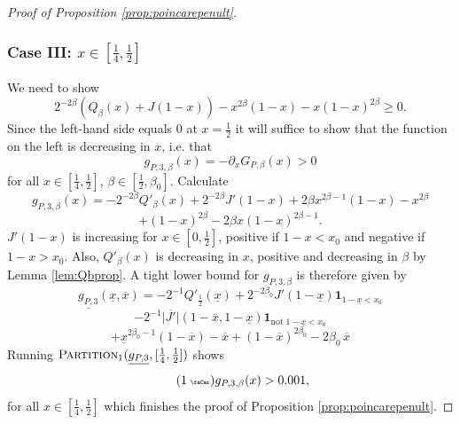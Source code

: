 \documentclass[12pt]{amsart}
\theoremstyle{plain}
\newcommand{\auto}{\tag{\addtocounter{equation}{1}\theequation\;{\tiny\faCar}}}
\theoremstyle{definition}
\theoremstyle{remark}
\numberwithin{equation}{section}
\begin{document}
\begin{proof}[Proof of Proposition \ref{prop:poincarepenult}]
\subsubsection*{Case III: $x\in [\tfrac14,\tfrac12]$}
We need to show
\[2^{-2\beta}( Q_\beta(x) + J(1-x)) - x^{2\beta}(1-x) - x(1-x)^{2\beta} \ge 0.\]
Since the left-hand side equals $0$ at $x=\tfrac12$ it will suffice to show that the function on the left is decreasing in $x$, i.e. that
\[ g_{P,3,\beta}(x)=-\partial_x G_{P,\beta}(x)>0\]
for all $x\in [\frac14,\frac12]$, $\beta\in[\frac12,\beta_0]$.
Calculate
\[ g_{P,3,\beta}(x)=-2^{-2\beta} Q'_\beta(x)+2^{-2\beta} J'(1-x) + 2\beta x^{2\beta-1} (1-x) - x^{2\beta} \] 
\[ + (1-x)^{2\beta} - 2\beta x(1-x)^{2\beta-1}. \]
$J'(1-x)$ is increasing for  $x\in [0, \tfrac12]$, positive if $1-x<x_0$ and negative if $1-x>x_0$.
Also,
$Q'_\beta(x)$ is decreasing in $x$, positive and decreasing in $\beta$ by Lemma \ref{lem:Qbprop}.
A tight lower bound for $g_{P,3,\beta}$ is therefore given by
\[ \underline{g_{P,3}}(\underline{x},\overline{x}) = - 2^{-1} Q'_{\frac12}(\underline{x}) + 2^{-2\beta_0} J'(1-\underline{x}) \mathbf{1}_{1-\underline{x}<x_0} \]
\[- 2^{-1}\overline{|J'|}(1-\overline{x},1-\underline{x})\mathbf{1}_{\text{not}\;1-\underline{x}<x_0} \]
\[ + \underline{x}^{2\beta_0-1}(1-\overline{x}) - \overline{x} + (1-\overline{x})^{2\beta_0}-2\beta_0\,\overline{x}  \]
Running $\textsc{Partition}_1(\underline{g_{P,3}},[\frac14,\frac12])$ shows
\begin{equation}\label{eqn:g_P_3_auto}\auto
g_{P,3,\beta}(x) > 0.001,
\end{equation}
for all $x\in[\frac14,\frac12]$ which finishes the proof of Proposition \ref{prop:poincarepenult}.
\end{proof}
\end{document}
